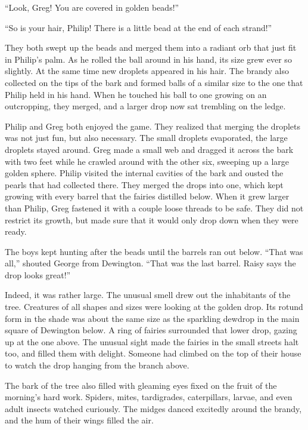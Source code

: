 \documentclass[10pt]{memoir}
\begin{document}
``Look, Greg! You are covered in golden beads!''

``So is your hair, Philip! There is a little bead at the end of each strand!''

They both swept up the beads and merged them into a radiant orb that just fit
in Philip's palm. As he rolled the ball around in his hand, its size grew ever
so slightly.  At the same time new droplets appeared in his hair. The brandy
also collected on the tips of the bark and formed balls of a similar size to
the one that Philip held in his hand. When he touched his ball to one growing
on an outcropping, they merged, and a larger drop now sat trembling on the
ledge.

Philip and Greg both enjoyed the game. They realized that merging the droplets
was not just fun, but also necessary. The small droplets evaporated, the large
droplets stayed around.  Greg made a small web and dragged it across the bark
with two feet while he crawled around with the other six, sweeping up a large
golden sphere. Philip visited the internal cavities of the bark and ousted the
pearls that had collected there.  They merged the drops into one, which kept
growing with every barrel that the fairies distilled below.  When it grew
larger than Philip, Greg fastened it with a couple loose threads to be safe.
They did not restrict its growth, but made sure that it would only drop down
when they were ready.

The boys kept hunting after the beads until the barrels ran out below. ``That
was all,'' shouted George from Dewington. ``That was the last barrel. Raisy
says the drop looks great!''

Indeed, it was rather large. The unusual smell drew out the inhabitants of the
tree. Creatures of all shapes and sizes were looking at the golden drop. Its
rotund form in the shade was about the same size as the sparkling dewdrop in
the main square of Dewington below. A ring of fairies surrounded that
lower drop, gazing up at the one above. The unusual sight made the fairies
in the small streets halt too, and filled them with delight. Someone had
climbed on the top of their house to watch the drop hanging from the branch
above.

The bark of the tree also filled with gleaming eyes fixed on the fruit of the
morning's hard work. Spiders, mites, tardigrades, caterpillars, larvae, and
even adult insects watched curiously. The midges danced excitedly around the
brandy, and the hum of their wings filled the air.
\end{document}
